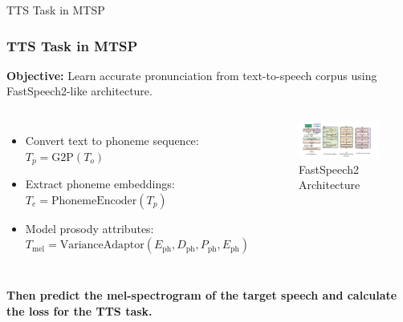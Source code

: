 \begin{frame}{TTS Task in MTSP}
    \frametitle{TTS Task in MTSP}
    \textbf{Objective:} Learn accurate pronunciation from text-to-speech corpus using FastSpeech2-like architecture.
    \begin{columns}[T] %
        \begin{itemize}
            \item Convert text to phoneme sequence: $T_p = \text{G2P}(T_o)$
            \item Extract phoneme embeddings: $T_e = \text{PhonemeEncoder}(T_p)$
            \item Model prosody attributes: $T_{\text{mel}} = \text{VarianceAdaptor}(E_{\text{ph}}, D_{\text{ph}}, P_{\text{ph}}, E_{\text{ph}})$
        \end{itemize}
        
        \begin{figure}[htpb]
            \centering
            \includegraphics[width=\textwidth]{figs/fastSpeech架构图.png} %
            \caption{FastSpeech2 Architecture}
            \label{fig:fastspeech2}
        \end{figure}
    \end{columns}
    \vspace{0.3cm}
    \textbf{Then predict the mel-spectrogram of the target speech and calculate the loss for the TTS task.}
\end{frame}


